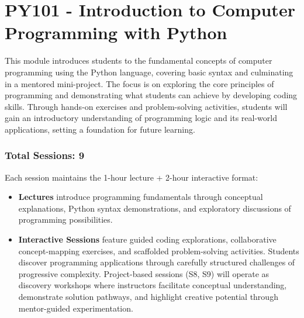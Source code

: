 
\section{PY101 - Introduction to Computer Programming with Python}
\addtocounter{section}{3} %

\begin{tcolorbox}[boxstyle, title={Module Overview}]
    This module introduces students to the fundamental concepts of computer programming using the Python language, covering basic syntax and culminating in a mentored mini-project. The focus is on exploring the core principles of programming and demonstrating what students can achieve by developing coding skills. Through hands-on exercises and problem-solving activities, students will gain an introductory understanding of programming logic and its real-world applications, setting a foundation for future learning.
\end{tcolorbox}

\subsubsection*{Total Sessions: 9}

\begin{tcolorbox}[boxstyle, title={Session Structure}]
    Each session maintains the 1-hour lecture + 2-hour interactive format:
    \begin{itemize}
        \item \textbf{Lectures} introduce programming fundamentals through conceptual explanations, Python syntax demonstrations, and exploratory discussions of programming possibilities.
        
        \item \textbf{Interactive Sessions} feature guided coding explorations, collaborative concept-mapping exercises, and scaffolded problem-solving activities. Students discover programming applications through carefully structured challenges of progressive complexity. Project-based sessions (S8, S9) will operate as discovery workshops where instructors facilitate conceptual understanding, demonstrate solution pathways, and highlight creative potential through mentor-guided experimentation.
    \end{itemize}
\end{tcolorbox}

